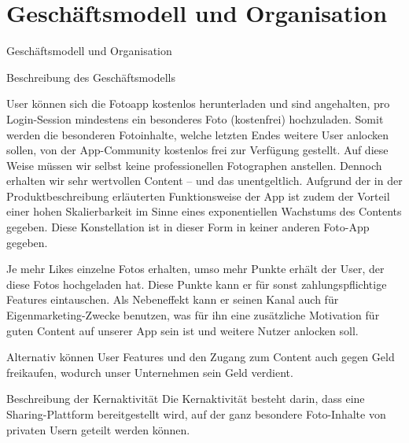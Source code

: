 \chapter{Geschäftsmodell und Organisation}


Geschäftsmodell und Organisation

Beschreibung des Geschäftsmodells

User können sich die Fotoapp kostenlos herunterladen und sind angehalten, pro Login-Session mindestens ein besonderes Foto (kostenfrei) hochzuladen. Somit werden die besonderen Fotoinhalte, welche letzten Endes weitere User anlocken sollen, von der App-Community kostenlos frei zur Verfügung gestellt. Auf diese Weise müssen wir selbst keine professionellen Fotographen anstellen. Dennoch erhalten wir sehr wertvollen Content – und das unentgeltlich. Aufgrund der in der Produktbeschreibung erläuterten Funktionsweise der App ist zudem der Vorteil einer hohen Skalierbarkeit im Sinne eines exponentiellen Wachstums des Contents gegeben. Diese Konstellation ist in dieser Form in keiner anderen Foto-App gegeben.

Je mehr Likes einzelne Fotos erhalten, umso mehr Punkte erhält der User, der diese Fotos hochgeladen hat. Diese Punkte kann er für sonst zahlungspflichtige Features eintauschen. Als Nebeneffekt kann er seinen Kanal auch für Eigenmarketing-Zwecke benutzen, was für ihn eine zusätzliche Motivation für guten Content auf unserer App sein ist und weitere Nutzer anlocken soll.

Alternativ können User Features und den Zugang zum Content auch gegen Geld freikaufen, wodurch unser Unternehmen sein Geld verdient.


Beschreibung der Kernaktivität
Die Kernaktivität besteht darin, dass eine Sharing-Plattform bereitgestellt wird, auf der ganz besondere Foto-Inhalte von privaten Usern geteilt werden können.



